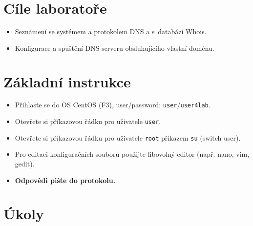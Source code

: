 
\section*{Cíle laboratoře}
\begin{itemize}
  \item Seznámení se systémem a protokolem DNS a s~databází Whois.
  \item Konfigurace a spuštění DNS serveru obsluhujícího vlastní doménu.
\end{itemize}

\section*{Základní instrukce}
\begin{itemize}
  \item Přihlaste se do OS CentOS (F3), user/password: {\tt user}/{\tt user4lab}.
  \item Otevřete si příkazovou řádku pro uživatele {\tt user}.
  \item Otevřete si příkazovou řádku pro uživatele {\tt root} příkazem {\tt su}
    (switch user).
  \item Pro editaci konfiguračních souborů použijte libovolný editor (např.
    nano, vim, gedit).
  \item {\bf Odpovědi pište do protokolu.}
\end{itemize}

\section*{Úkoly}

